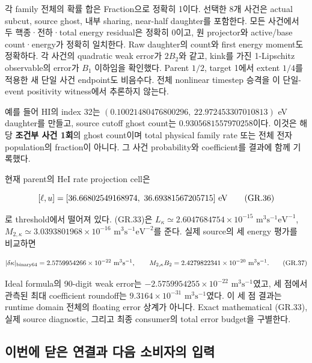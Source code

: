 \documentclass[11pt,a4paper]{article}
\begin{document}
각 family 전체의 확률 합은 Fraction으로 정확히 1이다. 선택한 8개 사건은 actual subcut, source ghost, 내부 sharing, near-half daughter를 포함한다. 모든 사건에서 두 핵종·전하·total energy residual은 정확히 0이고, 원 projector와 active/base count·energy가 정확히 일치한다. Raw daughter의 count와 first energy moment도 정확하다. 각 사건의 quadratic weak error가 \(2B_2\)와 같고, kink를 가진 1-Lipschitz observable의 error가 \(B_1\) 이하임을 확인했다. Parent \(1/2\), target 1에서 extent \(1/4\)를 적용한 새 단일 사건 endpoint도 비음수다. 전체 nonlinear timestep 승격을 이 단일-event positivity witness에서 추론하지 않는다.

예를 들어 HI의 index 32는 \((0.10021480476800296,\ 22.972453307010813)\) eV daughter를 만들고, source cutoff ghost count는 \(0.9305681557970258\)이다. 이것은 해당 \textbf{조건부 사건 1회}의 ghost count이며 total physical family rate 또는 전체 전자 population의 fraction이 아니다. 그 사건 probability와 coefficient를 결과에 함께 기록했다.

현재 parent의 HeI rate projection cell은

\[
 [\ell,u]=[36.66802549168974,\ 36.69381567205715]\ {\rm eV}
\tag{GR.36}
\]

로 threshold에서 떨어져 있다. (GR.33)은 \(L_\kappa\simeq2.6047684754\times10^{-15}\) \(\mathrm{m^3s^{-1}eV^{-1}}\), \(M_{2,\kappa}\simeq3.0393801968\times10^{-16}\) \(\mathrm{m^3s^{-1}eV^{-2}}\)를 준다. 실제 source의 세 energy 평가를 비교하면

\[
 |\delta\kappa|_{\rm binary64}
 =2.5759954266\times10^{-22}\ {\rm m^3s^{-1}},\qquad
 M_{2,\kappa}B_2=2.4279822341\times10^{-20}\ {\rm m^3s^{-1}}.
\tag{GR.37}
\]

Ideal formula의 90-digit weak error는 \(-2.5759954255\times10^{-22}\) \(\mathrm{m^3s^{-1}}\)였고, 세 점에서 관측된 최대 coefficient roundoff는 \(9.3164\times10^{-31}\) \(\mathrm{m^3s^{-1}}\)였다. 이 세 점 결과는 runtime domain 전체의 floating error 상계가 아니다. Exact mathematical (GR.33), 실제 source diagnostic, 그리고 최종 consumer의 total error budget을 구별한다.

\hypertarget{uxc774uxbc88uxc5d0-uxb2ebuxc740-uxc5f0uxacb0uxacfc-uxb2e4uxc74c-uxc18cuxbe44uxc790uxc758-uxc785uxb825}{%
\subsection{이번에 닫은 연결과 다음 소비자의 입력}\label{uxc774uxbc88uxc5d0-uxb2ebuxc740-uxc5f0uxacb0uxacfc-uxb2e4uxc74c-uxc18cuxbe44uxc790uxc758-uxc785uxb825}}
\end{document}
